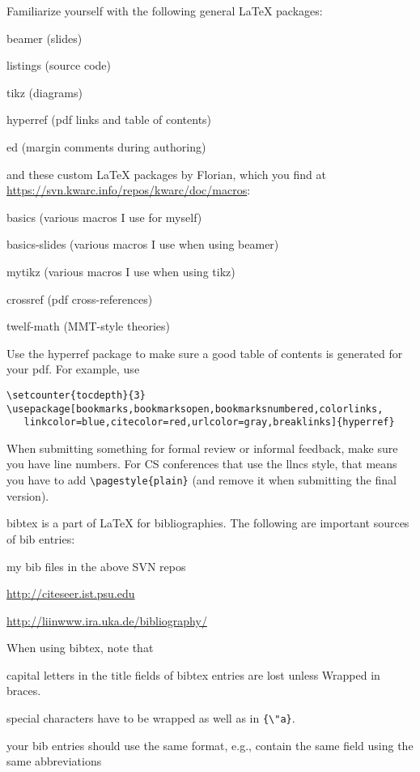\documentclass[12pt]{article}
\begin{document}
Familiarize yourself with the following general LaTeX packages:
\begin{compactitem}
\item beamer (slides)
\item listings (source code)
\item tikz (diagrams)
\item hyperref (pdf links and table of contents)
\item ed (margin comments during authoring)
\end{compactitem}
and these custom LaTeX packages by Florian, which you find at \url{https://svn.kwarc.info/repos/kwarc/doc/macros}:
\begin{compactitem}
\item basics (various macros I use for myself)
\item basics-slides (various macros I use when using beamer)
\item mytikz (various macros I use when using tikz)
\item crossref (pdf cross-references)
\item twelf-math (MMT-style theories)
\end{compactitem}
\medskip

Use the hyperref package to make sure a good table of contents is generated for your pdf.
For example, use
\begin{verbatim}
\setcounter{tocdepth}{3}
\usepackage[bookmarks,bookmarksopen,bookmarksnumbered,colorlinks,
   linkcolor=blue,citecolor=red,urlcolor=gray,breaklinks]{hyperref}
\end{verbatim}
\medskip

When submitting something for formal review or informal feedback, make sure you have line numbers.
For CS conferences that use the llncs style, that means you have to add \verb|\pagestyle{plain}| (and remove it when submitting the final version).

bibtex is a part of LaTeX for bibliographies.
The following are important sources of bib entries:
\begin{compactitem}
\item my bib files in the above SVN repos
\item \url{http://citeseer.ist.psu.edu}
\item \url{http://liinwww.ira.uka.de/bibliography/}
\end{compactitem}
When using bibtex, note that
\begin{compactitem}
\item capital letters in the title fields of bibtex entries are lost unless {W}rapped in braces.
\item special characters have to be wrapped as well as in \verb|{\"a}|.
\item your bib entries should use the same format, e.g., contain the same field using the same abbreviations
\end{compactitem}
\end{document}
